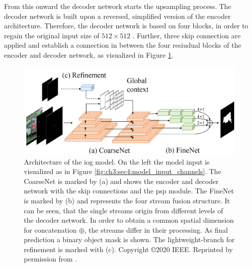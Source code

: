 From this onward the decoder network starts the upsampling process.
The decoder network is built upon a reversed, simplified version of the encoder architecture. %
Therefore, the decoder network is based on four blocks, in order to regain the original input size of  $512 \times 512$ .
Further, three skip connection are applied and establish a connection in between the four resiudual blocks of the encoder and decoder network, as visualized in Figure \ref{fig:ch3:sec4:arch}.
\begin{figure}
	\includegraphics[width=\linewidth]{figures/chap34_iog_arch.png}
	\caption[IOG Architecture]{		
		Architecture of the \gls{iog} model.
		On the left the model input is visualized as in Figure \ref{fig:ch3:sec4:model_input_channels}.
		The CoarseNet is marked by (a) and shows the encoder and decoder network with the skip connections and the \gls{psp} module.
		The FineNet is marked by (b) and represents the four stream fusion structure.
		It can be seen, that the single streams origin from different levels of the decoder network.
		In order to obtain a common spatial dimension for concatenation $ \oplus $, the streams differ in their processing.
		As final prediction a binary object mask is shown.
		The lightweight-branch for refinement is marked with (c).
		Copyright \copyright 2020 IEEE. Reprinted by permission from \cite{Zha20-IOG}.
	}
	\label{fig:ch3:sec4:arch}
\end{figure}

